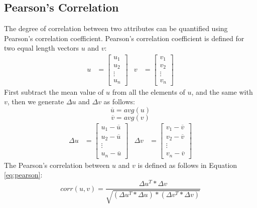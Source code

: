 \documentclass[USenglish]{uit-thesis}
\begin{document}
\subsection{Pearson's Correlation}
The degree of correlation between two attributes
can be quantified using Pearson's correlation coefficient.
Pearson's correlation coefficient is defined for two equal
length vectors $u$ and $v$:
\begin{align}
u &= \begin{bmatrix}
u_{1} \\
u_{2} \\
\vdots \\
u_{n}
\end{bmatrix} &
v &= \begin{bmatrix}
v_{1}\\
v_{2}\\
\vdots\\
v_{n}
\end{bmatrix}
\end{align}
First subtract the mean value of $u$ from all the elements of $u$, and the same with $v$, then we generate $\Delta{u}$ and $\Delta{v}$ as follows:
\[
\overline{u} = avg(u)
\]
\[
\overline{v} = avg(v)
\]
\begin{align}
\Delta{u} &=\begin{bmatrix}
u_{1} - \overline{u}\\
u_{2} - \overline{u}\\
\vdots\\
u_{n} - \overline{u}
\end{bmatrix} &
\Delta{v} &=\begin{bmatrix}
v_{1} - \overline{v}\\
v_{2} - \overline{v}\\
\vdots\\
v_{n} - \overline{v}
\end{bmatrix} 
\end{align}
The Pearson's correlation between $u$ and $v$ is defined as follows
in Equation\,\ref{eq:pearson}:
\begin{equation}
\label{eq:pearson}
corr(u,v) = \frac{\Delta{u^{T}} * \Delta{v}}{\sqrt{(\Delta{u^{T}}*\Delta{u})*(\Delta{v^{T}}*\Delta{v})}}
\end{equation}
\end{document}
